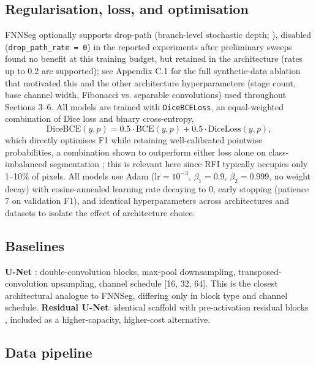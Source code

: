 \documentclass[11pt]{article}
\begin{document}
\subsection{Regularisation, loss, and optimisation}

FNNSeg optionally supports drop-path (branch-level stochastic depth; \citealp{larsson2017}), disabled (\texttt{drop\_path\_rate = 0}) in the reported experiments after preliminary sweeps found no benefit at this training budget, but retained in the architecture (rates up to 0.2 are supported); see Appendix C.1 for the full synthetic-data ablation that motivated this and the other architecture hyperparameters (stage count, base channel width, Fibonacci vs. separable convolutions) used throughout Sections 3--6. All models are trained with \texttt{DiceBCELoss}, an equal-weighted combination of Dice loss and binary cross-entropy,
\begin{equation}
\mathrm{DiceBCE}(y,p) = 0.5\cdot \mathrm{BCE}(y,p) + 0.5\cdot \mathrm{DiceLoss}(y,p),
\end{equation}
which directly optimises F1 while retaining well-calibrated pointwise probabilities, a combination shown to outperform either loss alone on class-imbalanced segmentation \citep{milletari2016}; this is relevant here since RFI typically occupies only 1--10\% of pixels. All models use Adam \citep{kingma2014} ($\mathrm{lr}=10^{-3}$, $\beta_1=0.9$, $\beta_2=0.999$, no weight decay) with cosine-annealed learning rate decaying to 0, early stopping (patience 7 on validation F1), and identical hyperparameters across architectures and datasets to isolate the effect of architecture choice.

\subsection{Baselines}

\textbf{U-Net} \citep{ronneberger2015}: double-convolution blocks, max-pool downsampling, transposed-convolution upsampling, channel schedule [16, 32, 64]. This is the closest architectural analogue to FNNSeg, differing only in block type and channel schedule. \textbf{Residual U-Net}: identical scaffold with pre-activation residual blocks \citep{he2016}, included as a higher-capacity, higher-cost alternative.

\subsection{Data pipeline}
\end{document}
